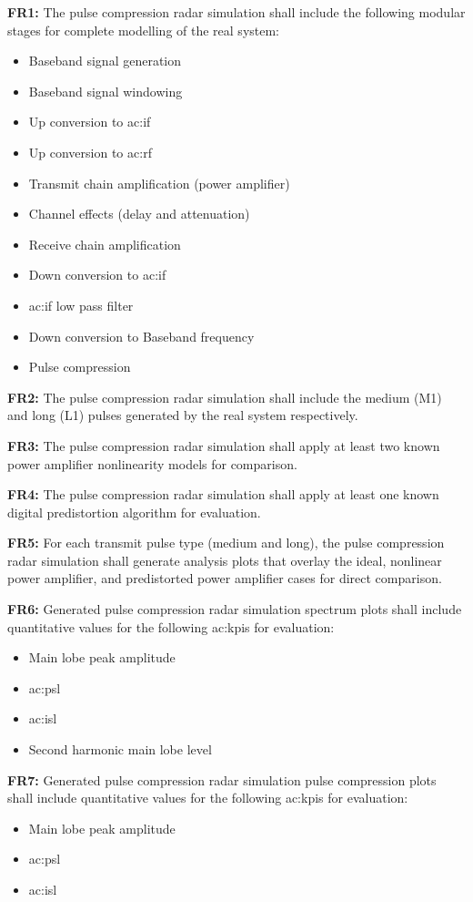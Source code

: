 \textbf{FR1:} The pulse compression radar simulation shall include the following modular stages for complete modelling of the real system: 
\begin{itemize}
    \item Baseband signal generation
    \item Baseband signal windowing
    \item Up conversion to \gls{ac:if}
    \item Up conversion to \gls{ac:rf}
    \item Transmit chain amplification (power amplifier)
    \item Channel effects (delay and attenuation)
    \item Receive chain amplification
    \item Down conversion to \gls{ac:if}
    \item \gls{ac:if} low pass filter 
    \item Down conversion to Baseband frequency
    \item Pulse compression
\end{itemize}
 
\textbf{FR2:} The pulse compression radar simulation shall include the medium (M1) and long (L1) pulses generated by the real system respectively.

\textbf{FR3:} The pulse compression radar simulation shall apply at least two known power amplifier nonlinearity models for comparison.

\textbf{FR4:} The pulse compression radar simulation shall apply at least one known digital predistortion algorithm for evaluation.

\textbf{FR5:} For each transmit pulse type (medium and long), the pulse compression radar simulation shall generate analysis plots that overlay the ideal, nonlinear power amplifier, and predistorted power amplifier cases for direct comparison.

\textbf{FR6:} Generated pulse compression radar simulation spectrum plots shall include quantitative values for the following \glspl{ac:kpi} for evaluation:
\begin{itemize}
    \item Main lobe peak amplitude
    \item \Gls{ac:psl}
    \item \Gls{ac:isl}
    \item Second harmonic main lobe level
\end{itemize}

\textbf{FR7:} Generated pulse compression radar simulation pulse compression plots shall include quantitative values for the following \glspl{ac:kpi} for evaluation:
\begin{itemize}
    \item Main lobe peak amplitude
    \item \Gls{ac:psl}
    \item \Gls{ac:isl}
\end{itemize}

